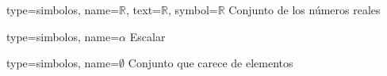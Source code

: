 

{
type={simbolos},
name={$\mathbb{R}$}, %
text={$\mathbb{R}$}, %
symbol={$\mathbb{R}$} %
}
{Conjunto de los números reales}

{
type={simbolos},
name={$\alpha$}
}
{Escalar}


{
type={simbolos},
name={$\emptyset$}
}
{Conjunto que carece de elementos}

